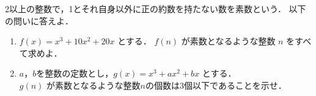 ﻿\documentclass[../../../uem_tok_q.tex]{subfiles}
\begin{document}
    2以上の整数で，1とそれ自身以外に正の約数を持たない数を素数という．%
    以下の問いに答えよ．

    \begin{enumerate}
        \item $f(x)=x^3+10x^2+20x$ とする．%
            $f(n)$ が素数となるような整数 $n$ をすべて求めよ．
        \item $a$，$b$を整数の定数とし，$g(x)=x^3+ax^2+bx$ とする．\\
            $g(n)$ が素数となるような整数$n$の個数は3個以下であることを示せ．
    \end{enumerate}
\end{document}
